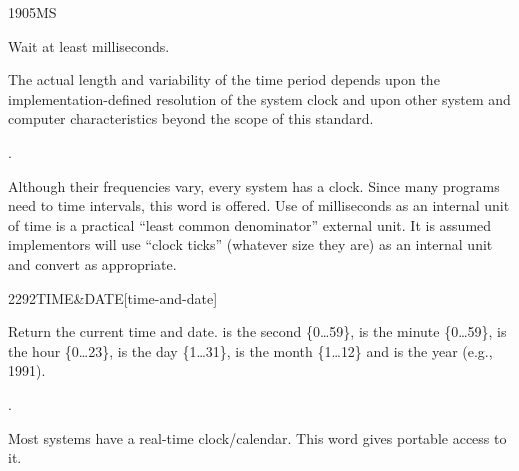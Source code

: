 

\begin{worddef}{1905}{MS}
\item {}

	Wait at least  milliseconds.

\note
	The actual length and variability of the time period depends
	upon the {im\-ple\-ment\-ation-de\-fin\-ed} resolution of the system clock
	and upon other system and computer characteristics beyond the
	scope of this standard.

\see {}.

	\begin{rationale} %
		Although their frequencies vary, every system has a clock.
		Since many programs need to time intervals, this word is
		offered. Use of milliseconds as an internal unit of time is
		a practical ``least common denominator'' external unit. It
		is assumed implementors will use ``clock ticks'' (whatever
		size they are) as an internal unit and convert as appropriate.
	\end{rationale}
\end{worddef}


\begin{worddef}[TIMEandDATE]{2292}{TIME\&DATE}[time-and-date]
\item {}

	Return the current time and date.
	 is the second \{0{\ldots}59\},
	 is the minute \{0{\ldots}59\},
	 is the hour \{0{\ldots}23\},
	 is the day \{1{\ldots}31\},
	 is the month \{1{\ldots}12\} and
	 is the year (e.g., 1991).

\see {}.

	\begin{rationale} %
		Most systems have a real-time clock/calendar.
		This word gives portable access to it.
	\end{rationale}
\end{worddef}
